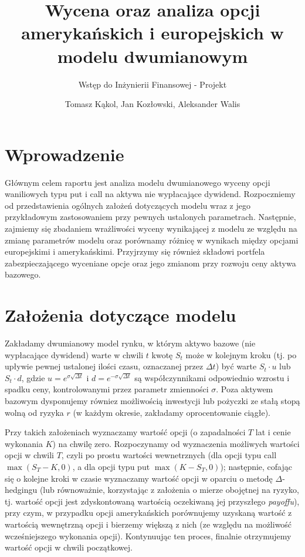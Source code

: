 \documentclass[
]{article}
\title{Wycena oraz analiza opcji amerykańskich i europejskich w modelu
dwumianowym}
\subtitle{Wstęp do Inżynierii Finansowej - Projekt}
\author{Tomasz Kąkol, Jan Kozłowski, Aleksander Walis}
\date{}
\begin{document}
\maketitle

\renewcommand*\contentsname{Spis treści}
{
\setcounter{tocdepth}{2}
\tableofcontents
}
\newpage

\hypertarget{wprowadzenie}{%
\section{Wprowadzenie}\label{wprowadzenie}}

Głównym celem raportu jest analiza modelu dwumianowego wyceny opcji
waniliowych typu put i call na aktywa nie wypłacające dywidend.
Rozpoczniemy od przedstawienia ogólnych założeń dotyczących modelu wraz
z jego przykładowym zastosowaniem przy pewnych ustalonych parametrach.
Następnie, zajmiemy się zbadaniem wrażliwości wyceny wynikającej z
modelu ze względu na zmianę parametrów modelu oraz porównamy różnicę w
wynikach między opcjami europejskimi i amerykańskimi. Przyjrzymy się
również składowi portfela zabezpieczającego wyceniane opcje oraz jego
zmianom przy rozwoju ceny aktywa bazowego.

\hypertarget{zaux142oux17cenia-dotyczux105ce-modelu}{%
\section{Założenia dotyczące
modelu}\label{zaux142oux17cenia-dotyczux105ce-modelu}}

Zakładamy dwumianowy model rynku, w którym aktywo bazowe (nie
wypłacające dywidend) warte w chwili \(t\) kwotę \(S_t\) może w kolejnym
kroku (tj. po upływie pewnej ustalonej ilości czasu, oznaczanej przez
\(\Delta t\)) być warte \(S_t \cdot u\) lub \(S_t \cdot d\), gdzie
\(u = e^{\sigma \sqrt{\Delta t}}\) i \(d = e^{-\sigma \sqrt{\Delta t}}\)
są współczynnikami odpowiednio wzrostu i spadku ceny, kontrolowanymi
przez parametr zmienności \(\sigma\). Poza aktywem bazowym dysponujemy
równiez możliwością inwestycji lub pożyczki ze stałą stopą wolną od
ryzyka \(r\) (w każdym okresie, zakładamy oprocentowanie ciągłe).

Przy takich założeniach wyznaczamy wartość opcji (o zapadalności \(T\)
lat i cenie wykonania \(K\)) na chwilę zero. Rozpoczynamy od wyznaczenia
możliwych wartości opcji w chwili \(T\), czyli po prostu wartości
wewnetrznych (dla opcji typu call \(\max (S_T - K, 0)\), a dla opcji
typu put \(\max (K - S_T, 0)\)); następnie, cofając się o kolejne kroki
w czasie wyznaczamy wartość opcji w oparciu o metodę \(\Delta\)-hedgingu
(lub równoważnie, korzystając z założenia o mierze obojętnej na ryzyko,
tj. wartość opcji jest zdyskontowaną wartością oczekiwaną jej przyszłego
\emph{payoffu}), przy czym, w przypadku opcji amerykańskich porównujemy
uzyskaną wartość z wartością wewnętrzną opcji i bierzemy większą z nich
(ze względu na możliwość wcześniejszego wykonania opcji). Kontynuując
ten proces, finalnie otrzymujemy wartość opcji w chwili początkowej.
\end{document}
